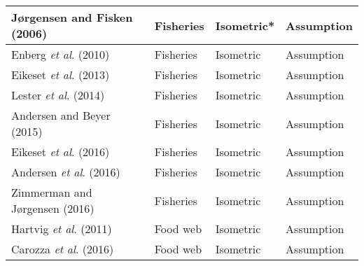 \documentclass[a4paper]{article} %
\begin{document}
\begin{table}[H]
\begin{tabular}{|l|l|l|l|}
    Jørgensen and Fisken (2006)         & Fisheries                 & Isometric*       & Assumption                     \\ \hline
    Enberg \textit{et al}. (2010)       & Fisheries                 & Isometric        & Assumption                     \\ \hline
    Eikeset \textit{et al}. (2013)      & Fisheries                 & Isometric        & Assumption                     \\ \hline
    Lester \textit{et al}. (2014)       & Fisheries                 & Isometric        & Assumption                     \\ \hline
    Andersen and Beyer (2015)           & Fisheries                 & Isometric        & Assumption                     \\ \hline
    Eikeset \textit{et al}. (2016)      & Fisheries                 & Isometric        & Assumption                     \\ \hline
    Andersen \textit{et al}. (2016)     & Fisheries                 & Isometric        & Assumption                     \\ \hline
    Zimmerman and Jørgensen (2016)      & Fisheries                 & Isometric        & Assumption                     \\ \hline
    Hartvig \textit{et al}. (2011)      & Food web                  & Isometric        & Assumption                     \\ \hline
    Carozza \textit{et al}. (2016)      & Food web                  & Isometric        & Assumption                     \\ \hline
    \end{tabular}
    \label{caloric_equivalents}
\end{table}

\newpage{}

\let\mkbibnamefamily\textsc\printbibliography[title=SI References]\thispagestyle{empty} %
\end{document}
